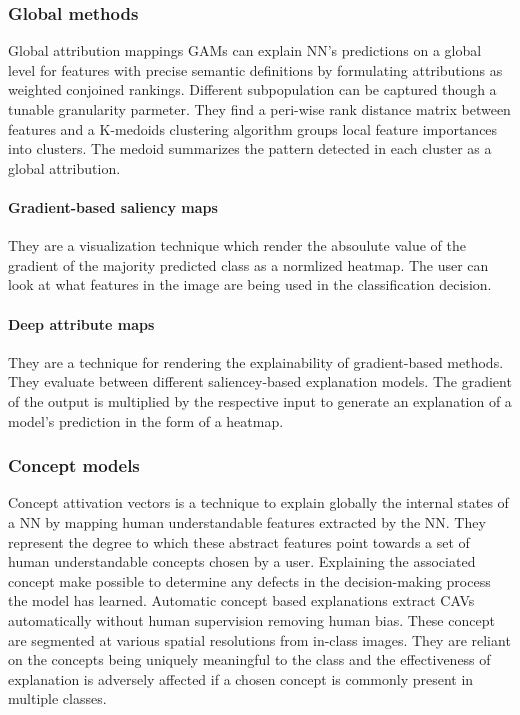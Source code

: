 		\subsubsection{Global methods}
		Global attribution mappings GAMs can explain NN's predictions on a global level for features with precise semantic definitions by formulating attributions as weighted conjoined rankings.
		Different subpopulation can be captured though a tunable granularity parmeter.
		They find a peri-wise rank distance matrix between features and a K-medoids clustering algorithm groups local feature importances into clusters.
		The medoid summarizes the pattern detected in each cluster as a global attribution.

			\paragraph{Gradient-based saliency maps}
			They are a visualization technique which render the absoulute value of the gradient of the majority predicted class as a normlized heatmap.
			The user can look at what features in the image are being used in the classification decision.

			\paragraph{Deep attribute maps}
			They are a technique for rendering the explainability of gradient-based methods.
			They evaluate between different saliencey-based explanation models.
			The gradient of the output is multiplied by the respective input to generate an explanation of a model's prediction in the form of a heatmap.

		\subsubsection{Concept models}
		Concept attivation vectors is a technique to explain globally the internal states of a NN by mapping human understandable features extracted by the NN.
		They represent the degree to which these abstract features point towards a set of human understandable concepts chosen by a user.
		Explaining the associated concept make possible to determine any defects in the decision-making process the model has learned.
		Automatic concept based explanations extract CAVs automatically without human supervision removing human bias.
		These concept are segmented at various spatial resolutions from in-class images.
		They are reliant on the concepts being uniquely meaningful to the class and the effectiveness of explanation is adversely affected if a chosen concept is commonly present in multiple classes.

